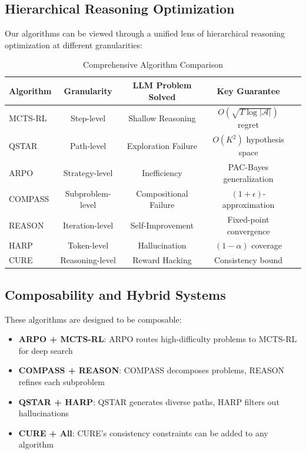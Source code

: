 \documentclass[11pt,a4paper]{article}
\newcommand{\calA}{\mathcal{A}}
\begin{document}
\subsection{Hierarchical Reasoning Optimization}

Our algorithms can be viewed through a unified lens of hierarchical reasoning optimization at different granularities:

\begin{table}[h]
\centering
\caption{Comprehensive Algorithm Comparison}
\begin{tabular}{lcccc}
\toprule
\textbf{Algorithm} & \textbf{Granularity} & \textbf{LLM Problem Solved} & \textbf{Key Guarantee} \\
\midrule
MCTS-RL & Step-level & Shallow Reasoning & $O(\sqrt{T\log|\calA|})$ regret \\
QSTAR & Path-level & Exploration Failure & $O(K^2)$ hypothesis space \\
ARPO & Strategy-level & Inefficiency & PAC-Bayes generalization \\
COMPASS & Subproblem-level & Compositional Failure & $(1+\epsilon)$-approximation \\
REASON & Iteration-level & Self-Improvement & Fixed-point convergence \\
HARP & Token-level & Hallucination & $(1-\alpha)$ coverage \\
CURE & Reasoning-level & Reward Hacking & Consistency bound \\
\bottomrule
\end{tabular}
\end{table}

\subsection{Composability and Hybrid Systems}

These algorithms are designed to be composable:

\begin{itemize}
    \item \textbf{ARPO + MCTS-RL}: ARPO routes high-difficulty problems to MCTS-RL for deep search
    \item \textbf{COMPASS + REASON}: COMPASS decomposes problems, REASON refines each subproblem
    \item \textbf{QSTAR + HARP}: QSTAR generates diverse paths, HARP filters out hallucinations
    \item \textbf{CURE + All}: CURE's consistency constraints can be added to any algorithm
\end{itemize}
\end{document}
